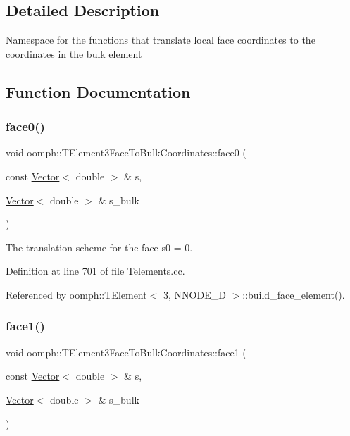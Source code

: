 \subsection{Detailed Description}
Namespace for the functions that translate local face coordinates to the coordinates in the bulk element 

\subsection{Function Documentation}
\mbox{\label{namespaceoomph_1_1TElement3FaceToBulkCoordinates_a5219ed97ede607f460050f82386913d1}} 
\subsubsection{\texorpdfstring{face0()}{face0()}}
{\footnotesize\ttfamily void oomph\+::\+T\+Element3\+Face\+To\+Bulk\+Coordinates\+::face0 (\begin{DoxyParamCaption}\item[{const \hyperlink{classoomph_1_1Vector}{Vector}$<$ double $>$ \&}]{s,  }\item[{\hyperlink{classoomph_1_1Vector}{Vector}$<$ double $>$ \&}]{s\+\_\+bulk }\end{DoxyParamCaption})}



The translation scheme for the face s0 = 0. 



Definition at line 701 of file Telements.\+cc.



Referenced by oomph\+::\+T\+Element$<$ 3, N\+N\+O\+D\+E\+\_\+D $>$\+::build\+\_\+face\+\_\+element().

\mbox{\label{namespaceoomph_1_1TElement3FaceToBulkCoordinates_a34958665c3b0f20c4ec8358ed867a6ce}} 
\subsubsection{\texorpdfstring{face1()}{face1()}}
{\footnotesize\ttfamily void oomph\+::\+T\+Element3\+Face\+To\+Bulk\+Coordinates\+::face1 (\begin{DoxyParamCaption}\item[{const \hyperlink{classoomph_1_1Vector}{Vector}$<$ double $>$ \&}]{s,  }\item[{\hyperlink{classoomph_1_1Vector}{Vector}$<$ double $>$ \&}]{s\+\_\+bulk }\end{DoxyParamCaption})}



